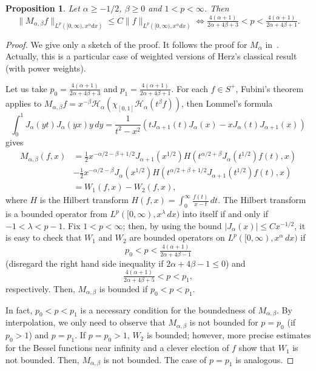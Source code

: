 \documentclass[12pt,leqno]{amsart}
\theoremstyle{plain}
\newtheorem{Pro}[Thm]{Proposition}
\newcommand{\lpnorm}[3]{\|{#1}\|_{L^{#2}({#3})}} %
\newcommand{\htra}{\mathcal{H}_\alpha} %
\begin{document}
\begin{Pro}
\label{pro:acotMab}
Let $\alpha \ge -1/2$, $\beta \ge 0$ and $1<p<\infty$. Then
\begin{equation*}
    \lpnorm{M_{\alpha,\beta}f}p{[0,\infty),x^{\alpha}dx}
      \le C \lpnorm{f}p{[0,\infty),x^{\alpha}dx} 
    \iff
    \tfrac{4(\alpha+1)}{2\alpha+4\beta+3} < p
      < \tfrac{4(\alpha+1)}{2\alpha+4\beta+1}.
\end{equation*}
\end{Pro}
\begin{proof}
We give only a sketch of the proof. It follows the proof for $M_\alpha$
in~\cite{Var}. Actually, this is a particular case of weighted versions of
Herz's classical result (with power weights).

Let us take $p_0 = \tfrac{4(\alpha+1)}{2\alpha+4\beta+3}$ and
$p_1 = \tfrac{4(\alpha+1)}{2\alpha+4\beta+1}$. For each $f \in S^+$, Fubini's
theorem applies to $M_{\alpha,\beta}f =
x^{-\beta}\htra(\chi_{[0,1]}\htra(t^{\beta}f))$, then Lommel's
formula
\begin{equation*}
    \int_0^1 J_\alpha(yt)J_\alpha(yx) y\,dy
    = \frac1{t^2-x^2} (tJ_{\alpha+1}(t)J_{\alpha}(x)
      - xJ_{\alpha}(t)J_{\alpha+1}(x))
\end{equation*}
gives
\begin{align*}
   M_{\alpha,\beta}(f,x) &=
     \tfrac12 x^{-\alpha/2-\beta+1/2} J_{\alpha+1}(x^{1/2})
     H(t^{\alpha/2+\beta}J_{\alpha}(t^{1/2})f(t),x)
    \\
        &- \tfrac12 x^{-\alpha/2-\beta} J_{\alpha}(x^{1/2})
     H(t^{\alpha/2+\beta+1/2}J_{\alpha+1}(t^{1/2})f(t),x)
   \\
    &= W_1(f,x) - W_2(f,x),
\end{align*}
where $H$ is the Hilbert transform $H(f,x) = \int_0^\infty
\frac{f(t)}{x-t}\,dt$. The Hilbert transform is a bounded operator from
$L^p([0,\infty),x^\lambda\,dx)$ into itself if and only if $-1<\lambda<p-1$.
Fix $1 < p < \infty$; then, by using the bound $|J_{\alpha}(x)| \le C
x^{-1/2}$, it is easy to check that $W_1$ and $W_2$ are bounded operators on
$L^p([0,\infty),x^\alpha\,dx)$ if
\begin{equation*}
   p_0 < p < \tfrac{4(\alpha+1)}{2\alpha+4\beta-1}
\end{equation*}
(disregard the right hand side inequality if $2\alpha+4\beta-1 \leq 0$)
and
\begin{equation*}
   \tfrac{4(\alpha+1)}{2\alpha+4\beta+5} < p < p_1,
\end{equation*}
respectively. Then, $M_{\alpha,\beta}$ is bounded if $p_0 < p < p_1$.

In fact, $p_0<p<p_1$ is a necessary condition for the boundedness of
$M_{\alpha,\beta}$. By interpolation, we only need to observe that
$M_{\alpha,\beta}$ is not bounded for $p=p_0$ (if $p_0 > 1$) and $p=p_1$. If
$p = p_0 > 1$, $W_2$ is bounded; however, more precise estimates for the
Bessel functions near infinity and a clever election of $f$ show that $W_1$
is not bounded. Then, $M_{\alpha,\beta}$ is not bounded. The case of $p =
p_1$ is analogous.
\end{proof}
\end{document}
